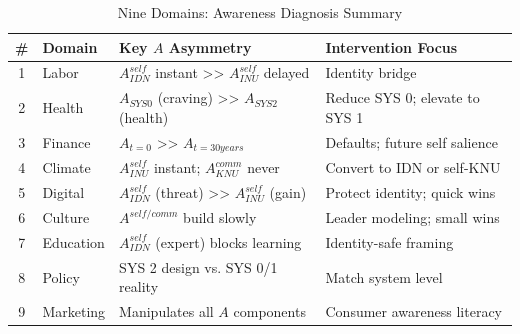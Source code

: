 \begin{table}[htbp]
\centering
\caption{Nine Domains: Awareness Diagnosis Summary}
\label{tab:nine-domains-awareness}
\small
\renewcommand{\arraystretch}{1.2}
\begin{tabular}{@{}clll@{}}
\toprule
\textbf{\#} & \textbf{Domain} & \textbf{Key $A$ Asymmetry} & \textbf{Intervention Focus} \\
\midrule
1 & Labor & $A^{self}_{IDN}$ instant >> $A^{self}_{INU}$ delayed & Identity bridge \\
2 & Health & $A_{SYS0}$ (craving) >> $A_{SYS2}$ (health) & Reduce SYS 0; elevate to SYS 1 \\
3 & Finance & $A_{t=0}$ >> $A_{t=30years}$ & Defaults; future self salience \\
4 & Climate & $A^{self}_{INU}$ instant; $A^{comm}_{KNU}$ never & Convert to IDN or self-KNU \\
5 & Digital & $A^{self}_{IDN}$ (threat) >> $A^{self}_{INU}$ (gain) & Protect identity; quick wins \\
6 & Culture & $A^{self/comm}$ build slowly & Leader modeling; small wins \\
7 & Education & $A^{self}_{IDN}$ (expert) blocks learning & Identity-safe framing \\
8 & Policy & SYS 2 design vs. SYS 0/1 reality & Match system level \\
9 & Marketing & Manipulates all $A$ components & Consumer awareness literacy \\
\bottomrule
\end{tabular}
\end{table}


